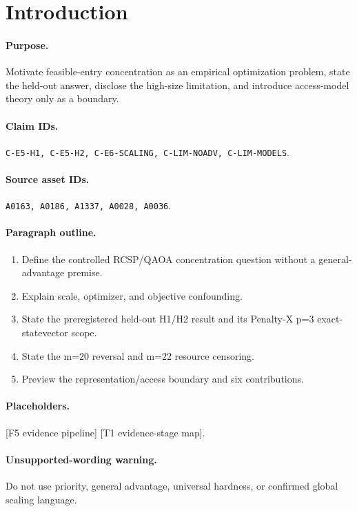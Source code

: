 \section{Introduction}

\paragraph{Purpose.}
Motivate feasible-entry concentration as an empirical optimization problem,
state the held-out answer, disclose the high-size limitation, and introduce
access-model theory only as a boundary.

\paragraph{Claim IDs.}
\texttt{C-E5-H1, C-E5-H2, C-E6-SCALING, C-LIM-NOADV, C-LIM-MODELS}.

\paragraph{Source asset IDs.}
\texttt{A0163, A0186, A1337, A0028, A0036}.

\paragraph{Paragraph outline.}
\begin{enumerate}
  \item Define the controlled RCSP/QAOA concentration question without a
  general-advantage premise.
  \item Explain scale, optimizer, and objective confounding.
  \item State the preregistered held-out H1/H2 result and its Penalty-X p=3
  exact-statevector scope.
  \item State the m=20 reversal and m=22 resource censoring.
  \item Preview the representation/access boundary and six contributions.
\end{enumerate}

\paragraph{Placeholders.}
[F5 evidence pipeline] [T1 evidence-stage map].

\paragraph{Unsupported-wording warning.}
Do not use priority, general advantage, universal hardness, or confirmed global
scaling language.

